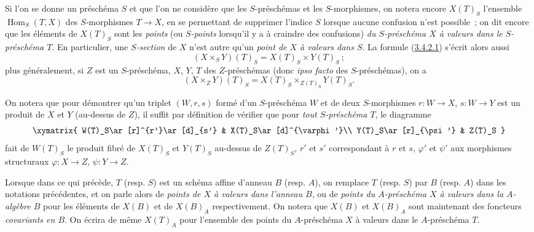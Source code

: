 \begin{env}[3.4.3]
\label{I.3.4.3-fr}
Si l'on se donne un préschéma $S$ et que l'on ne considère que les
$S$-préschémas et les $S$-morphismes, on notera encore $X(T)_S$ l'ensemble
$\operatorname{Hom}_S(T,X)$ des $S$-morphismes $T\to X$, en se permettant de
supprimer l'indice $S$ lorsque aucune confusion n'est possible~; on dit encore
que les éléments de $X(T)_S$ sont les \emph{points} (ou \emph{$S$-points}
lorsqu'il y a à craindre des confusions) \emph{du $S$-préschéma $X$ à valeurs
dans le $S$-préschéma $T$}. En particulier, une \emph{$S$-section} de $X$
n'est autre qu'un \emph{point de $X$ à valeurs dans $S$}. La formule
(\hyperref[I.3.4.2.1-fr]{3.4.2.1}) s'écrit alors aussi
\label{I.3.4.3.1-fr}
\[
  (X\times_S Y)(T)_S=X(T)_S\times Y(T)_S~;
  \tag{3.4.3.1}
\]
plus généralement, si $Z$ est un $S$-préschéma, $X$, $Y$, $T$ des
$Z$-préschémas (donc \emph{ipso facto} des $S$-préschémas), on a
\label{I.3.4.3.2-fr}
\[
  (X\times_Z Y)(T)_S=X(T)_S\times_{Z(T)_S}Y(T)_S.
  \tag{3.4.3.2}
\]

On notera que pour démontrer qu'un triplet $(W,r,s)$ formé d'un $S$-préschéma
$W$ et de deux $S$-morphismes $r:W\to X$, $s:W\to Y$ est un produit de $X$ et
$Y$ (au-dessus de $Z$), il suffit par définition de vérifier que pour
\emph{tout $S$-préschéma $T$}, le diagramme
\label{I.3.4.3.product-diagram-fr}
\[
  \xymatrix{
    W(T)_S\ar[r]^{r'}\ar[d]_{s'} & X(T)_S\ar[d]^{\varphi'}\\
    Y(T)_S\ar[r]_{\psi'} & Z(T)_S
  }
\]
fait de $W(T)_S$ le produit fibré de $X(T)_S$ et $Y(T)_S$ au-dessus de
$Z(T)_S$, $r'$ et $s'$ correspondant à $r$ et $s$, $\varphi'$ et $\psi'$ aux
morphismes structuraux $\varphi:X\to Z$, $\psi:Y\to Z$.
\end{env}

\begin{env}[3.4.4]
\label{I.3.4.4-fr}
Lorsque dans ce qui précède, $T$ (resp. $S$) est un schéma affine d'anneau $B$
(resp. $A$), on remplace $T$ (resp. $S$) par $B$ (resp. $A$) dans les notations
précédentes, et on parle alors de \emph{points de $X$ à valeurs dans l'anneau
$B$}, ou de \emph{points du $A$-préschéma $X$ à valeurs dans la $A$-algèbre
$B$} pour les éléments de $X(B)$ et de $X(B)_A$ respectivement. On notera que
$X(B)$ et $X(B)_A$ sont maintenant des foncteurs \emph{covariants en $B$}. On
écrira de même $X(T)_A$ pour l'ensemble des points du $A$-préschéma $X$ à
valeurs dans le $A$-préschéma $T$.
\end{env}

